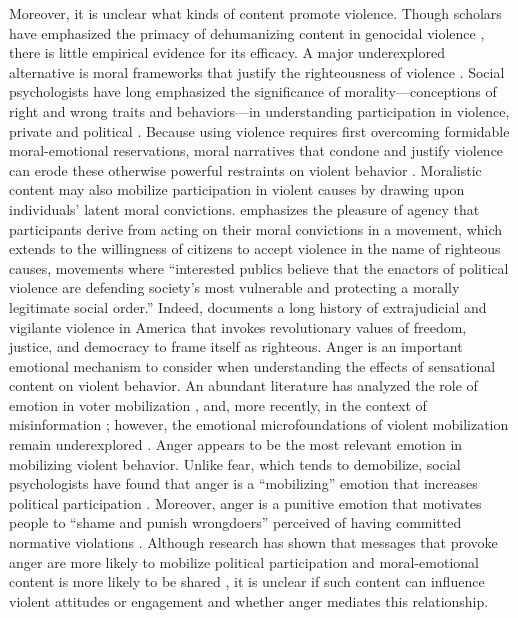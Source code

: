 \documentclass[12pt, letterpaper]{article}
\begin{document}
Moreover, it is unclear what kinds of content promote violence. Though scholars have emphasized the primacy of dehumanizing content in genocidal violence \citep{fein1979accounting, charny1982can}, there is little empirical evidence for its efficacy. A major underexplored alternative is moral frameworks that justify the righteousness of violence \citep{viterna2014radical}. Social psychologists have long emphasized the significance of morality---conceptions of right and wrong traits and behaviors---in understanding participation in violence, private and political \citep{bandura1975disinhibition,baumeister1999evil,beck1999prisoners,fiske2014virtuous}. Because using violence requires first overcoming formidable moral-emotional reservations, moral narratives that condone and justify violence can erode these otherwise powerful restraints on violent behavior \citep{baumeister1999evil,beck1999prisoners,fincher2016perceptual}. Moralistic content may also mobilize participation in violent causes by drawing upon individuals' latent moral convictions. \cite{wood2003insurgent} emphasizes the pleasure of agency that participants derive from acting on their moral convictions in a movement, which \cite{viterna2014radical} extends to the willingness of citizens to accept violence in the name of righteous causes, movements where ``interested publics believe that the enactors of political violence are defending society's most vulnerable and protecting a morally legitimate social order.'' Indeed, \cite{kirkpatrick2008uncivil} documents a long history of extrajudicial and vigilante violence in America that invokes revolutionary values of freedom, justice, and democracy to frame itself as righteous.
Anger is an important emotional mechanism to consider when understanding the effects of sensational content on violent behavior. An abundant literature has analyzed the role of emotion in voter mobilization \citep{ansolabehere1997going,banks2014anger,brader2005striking,brader2006campaigning,freedman1999measuring,huber2015seeingred,marcus2000affective,mendelberg2001race}, and, more recently, in the context of misinformation \citep{vosoughi2018spread}; however, the emotional microfoundations of violent mobilization remain underexplored \citep{viterna2013women}. Anger appears to be the most relevant emotion in mobilizing violent behavior. Unlike fear, which tends to demobilize, social psychologists have found that anger is a ``mobilizing'' emotion that increases political participation \citep{ansolabehere1997going, banks2014anger, lerner2001fear,ryan2012click, valentino2002cues, valentino2011election}. Moreover, anger is a punitive emotion that motivates people to ``shame and punish wrongdoers'' perceived of having committed normative violations \citep{crockett2017moral, goldberg1999rage}. Although research has shown that messages that provoke anger are more likely to mobilize political participation \citep{ryan2012click,valentino2002cues, valentino2011election} and moral-emotional content is more likely to be shared \citep{brady2017emotion}, it is unclear if such content can influence violent attitudes or engagement and whether anger mediates this relationship. 
\end{document}
